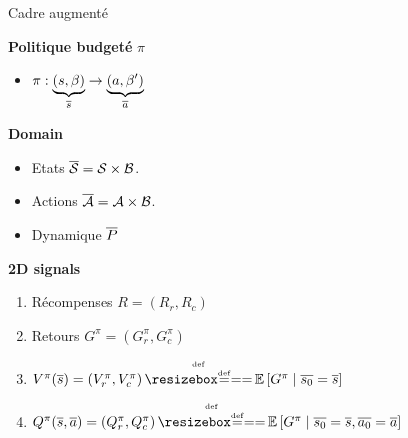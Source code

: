 \documentclass[french,handout]{beamer}
\begin{document}
    \begin{frame}{Cadre augmenté}

        \textbf{Politique budgeté} $\pi$
        \begin{itemize}
            \pause\item $ \pi:\underbrace{(s,\beta)}_{\overline{s}} \rightarrow \underbrace{(a,\beta')}_{\overline{a}}$
        \end{itemize}

        \textbf{Domain}
        \begin{itemize}
            \pause\item Etats $\overline{\mathcal{S}} = \mathcal{S}\times\mathcal{B}$.
            \pause\item Actions $\overline{\mathcal{A}} = \mathcal{A}\times\mathcal{B}$.
            \pause\item Dynamique $\overline{P}$
        \end{itemize}
        \textbf{2D signals}
        \begin{enumerate}
            \pause\item Récompenses $R = (R_r, R_c)$
            \pause\item Retours $G^\pi = (G_r^\pi, G_c^\pi)$
            \pause\item $V^\pi(\os) = (V_r^\pi, V_c^\pi) \eqdef \expectedvalue\left[ G^\pi \condbar \ov{s_0} = \os\right]$
            \pause\item $Q^\pi(\os, \oa)= (Q_r^\pi, Q_c^\pi) \eqdef \expectedvalue\left[ G^\pi \condbar \ov{s_0} = \os, \ov{a_0} = \oa\right]$
        \end{enumerate}

    \end{frame}
\end{document}
